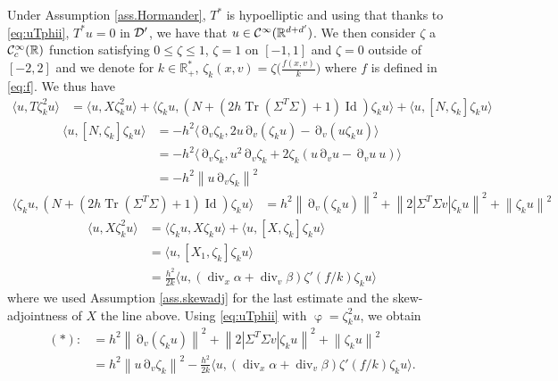 \documentclass[12pt]{amsart}
\newcommand{\Id}{\operatorname{Id}}
\newcommand{\R}{\mathbb R}
\newcommand{\Tr}{{\operatorname{Tr}}}
\renewcommand{\div}{\operatorname{div}}
\def\<{\langle}
\def\>{\rangle}
\numberwithin{equation}{section}
\numberwithin{figure}{section}
\DeclareMathOperator{\p}{\partial}
\DeclareMathOperator{\phii}{\varphi}
\newcommand{\vvert}[1]{\left\lVert#1\right\rVert}
\begin{document}
Under Assumption \ref{ass.Hormander}, $T^*$ is hypoelliptic and using that thanks to \eqref{eq:uTphii}, $T^*u=0$ in ${\mathcal D}'$, we have that $u\in\ccc^\infty(\R^{d+d'})$. We then consider $\zeta$ a $\ccc^\infty_c(\R)$ function satisfying $0\leq\zeta\leq1$, $\zeta = 1$ on $[-1,1]$ and $\zeta=0$ outside of $[-2,2]$ and we denote for $k\in\R_+^*$, $\zeta_k(x,v) = \zeta\Big(\frac{f(x,v)}{k}\Big)$ where $f$ is defined in \eqref{eq:f}. We thus have
\begin{equation*}
\begin{split}
    \<u,T\zeta_k^2 u\> &= \<u,X\zeta_k^2 u\> + \<\zeta_k u,(N+(2h\Tr(\Sigma^T\Sigma)+1)\Id)\zeta_k u\> + \<u, [N,\zeta_k]\zeta_k u\>
\end{split}
\end{equation*}
\begin{equation*}
\begin{split}
    \<u, [N,\zeta_k]\zeta_k u\> &= -h^2\<\p_v\zeta_k,2u\p_v(\zeta_k u)-\p_v(u\zeta_k u)\>\\
    &= -h^2\<\p_v\zeta_k,u^2\p_v\zeta_k+2\zeta_k(u\p_v u-\p_vu\ u)\>\\
    &= -h^2\vvert{u\p_v\zeta_k}^2
\end{split}
\end{equation*}
\begin{equation*}
\begin{split}
    \<\zeta_k u,(N+(2h\Tr(\Sigma^T\Sigma)+1)\Id)\zeta_k u\> &= h^2\vvert{\p_v(\zeta_k u)}^2 + \vvert{2|\Sigma^T\Sigma v|\zeta_k u}^2 + \vvert{\zeta_k u}^2
\end{split}
\end{equation*}
\begin{equation*}
\begin{split}
    \<u,X\zeta_k^2 u\> &= \<\zeta_k u,X\zeta_k u\> + \<u,[X,\zeta_k]\zeta_k u\>\\
    &= \<u,[X_1,\zeta_k]\zeta_k u\>\\
    &= \frac{h^2}{2k}\<u,(\div_x\alpha + \div_v\beta)\zeta'(f/k)\zeta_k u\>
\end{split}
\end{equation*}
where we used Assumption \ref{ass.skewadj} for the last estimate and the skew-adjointness of $X$ the line above. Using \eqref{eq:uTphii} with $\phii = \zeta_k^2u$, we obtain
\begin{equation*}
\begin{split}
    (\ast):&= h^2\vvert{\p_v(\zeta_k u)}^2 + \vvert{2|\Sigma^T\Sigma v|\zeta_k u}^2 + \vvert{\zeta_k u}^2\\
    &= h^2\vvert{u\p_v\zeta_k}^2 - \frac{h^2}{2k}\<u,(\div_x\alpha + \div_v\beta)\zeta'(f/k)\zeta_k u\>.
\end{split}
\end{equation*}
\end{document}
